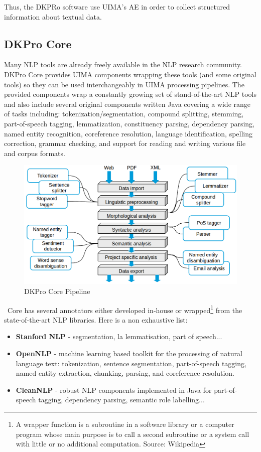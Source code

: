 Thus, the DKPRo software use UIMA's AE in order to collect structured information about textual data. 
\subsection{DKPro Core}
Many NLP tools are already freely available in the NLP research community. DKPro Core \cite{TUD-CS-2014-0864} provides UIMA components wrapping these tools (and some original tools) so they can be used interchangeably in UIMA processing pipelines. The provided components wrap a constantly growing set of stand-of-the-art NLP tools and also include several original components written Java covering a wide range of tasks including: tokenization/segmentation, compound splitting, stemming, part-of-speech tagging, lemmatization, constituency parsing, dependency parsing, named entity recognition, coreference resolution, language identification, spelling correction, grammar checking, and support for reading and writing various file and corpus formats. 
\
\begin{figure}[H]
    \centering
    \includegraphics[width=1\textwidth]{fig/dkpro-pipeline.png}
    \caption[Short caption]{DKPro Core Pipeline}
    \label{fig:dkpro-pipeline}
\end{figure}
\
Core has several annotators either developed in-house or wrapped\footnote{A wrapper function is a subroutine in a software library or a computer program whose main purpose is to call a second subroutine or a system call with little or no additional computation. Source: Wikipedia} from the state-of-the-art NLP libraries. Here is a non exhaustive list:
\begin{itemize}
  \item \textbf{Stanford NLP} - segmentation, la lemmatisation, part of speech...
  \item \textbf{OpenNLP} - machine learning based toolkit for the processing of natural language text: tokenization, sentence segmentation, part-of-speech tagging, named entity extraction, chunking, parsing, and coreference resolution. 
  \item \textbf{CleanNLP} - robust NLP components implemented in Java for part-of-speech tagging, dependency parsing, semantic role labelling... 
\end{itemize}

